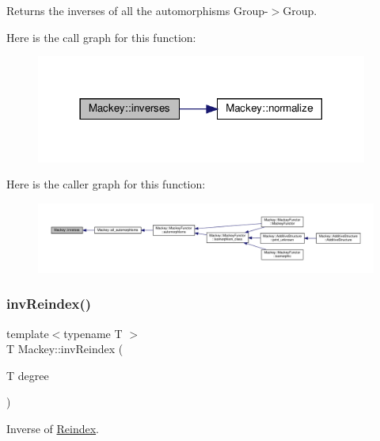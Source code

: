 Returns the inverses of all the automorphisms Group-\/$>$Group. 

Here is the call graph for this function\+:\nopagebreak
\begin{figure}[H]
\begin{center}
\leavevmode
\includegraphics[width=309pt]{namespaceMackey_a8c1525b210b4699780bbe05cb16f0e7b_cgraph}
\end{center}
\end{figure}
Here is the caller graph for this function\+:\nopagebreak
\begin{figure}[H]
\begin{center}
\leavevmode
\includegraphics[width=350pt]{namespaceMackey_a8c1525b210b4699780bbe05cb16f0e7b_icgraph}
\end{center}
\end{figure}
\mbox{\label{namespaceMackey_a5efb3695c450e4e590b86f20700f726b}} 
\subsubsection{\texorpdfstring{inv\+Reindex()}{invReindex()}\hspace{0.1cm}{\footnotesize\ttfamily [1/2]}}
{\footnotesize\ttfamily template$<$typename T $>$ \\
T Mackey\+::inv\+Reindex (\begin{DoxyParamCaption}\item[{T}]{degree }\end{DoxyParamCaption})\hspace{0.3cm}{\ttfamily [inline]}}



Inverse of \hyperlink{namespaceMackey_a7da73ade3ee83c4ffd614e79242d7c04}{Reindex}. 

